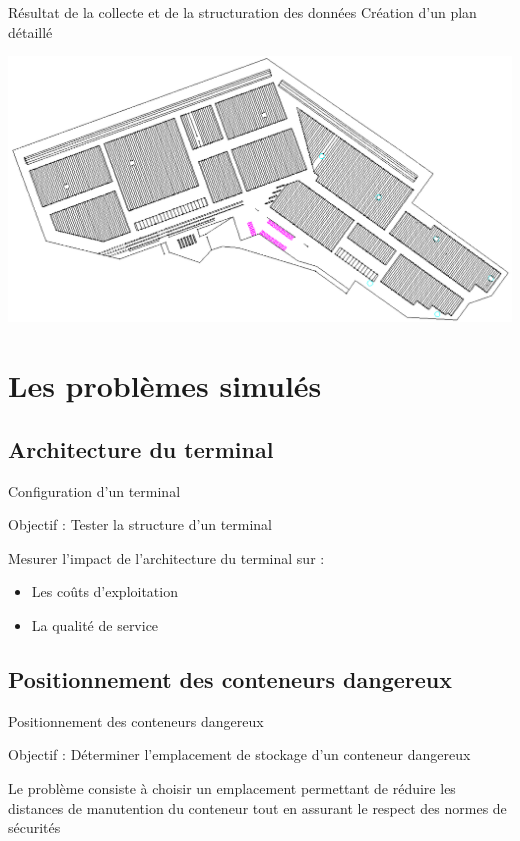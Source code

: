 \documentclass{beamer}
\begin{document}
\begin{frame}{Résultat de la collecte et de la structuration des données}
    Création d'un plan détaillé
    \begin{center}
      \includegraphics[height=.70\textheight]{fig/planTerminalDetailleBlanc.png}
    \end{center}
\end{frame} 
\section{Les problèmes simulés}
\subsection{Architecture du terminal}
\begin{frame}{Configuration d'un terminal}
  \begin{block}{Objectif :}
    Tester la structure d'un terminal
  \end{block}
  \pause
  Mesurer l'impact de l'architecture du terminal sur : 
  \begin{itemize}
  \pause
   \item Les coûts d'exploitation
  \pause
   \item La qualité de service
  \end{itemize}
 \end{frame}
\subsection{Positionnement des conteneurs dangereux}
\begin{frame}{Positionnement des conteneurs dangereux}
  \begin{block}{Objectif :}
    Déterminer l'emplacement de stockage d'un conteneur dangereux
  \end{block}
  \pause
  Le problème consiste à choisir un emplacement permettant de réduire les distances de manutention du conteneur tout en assurant le respect des normes de sécurités
 \end{frame}
\end{document}

